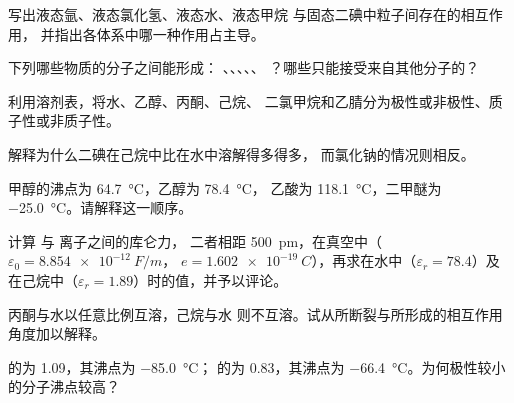 \begin{exercise}[$\star$]\label{exo:b1:intermolecular-forces-solvents:1}
写出液态氩、液态氯化氢、液态水、液态甲烷
与固态二碘中粒子间存在的相互作用，
并指出各体系中哪一种作用占主导。
\end{exercise}

\begin{exercise}[$\star$]\label{exo:b1:intermolecular-forces-solvents:2}
下列哪些物质的分子之间能形成：
、、、、、
？哪些只能接受来自其他分子的？
\end{exercise}

\begin{exercise}[$\star$]\label{exo:b1:intermolecular-forces-solvents:3}
           利用溶剂表，将水、乙醇、丙酮、己烷、
           二氯甲烷和乙腈分为极性或非极性、质子性或非质子性。
\end{exercise}

\begin{exercise}[$\star$]\label{exo:b1:intermolecular-forces-solvents:4}
解释为什么二碘在己烷中比在水中溶解得多得多，
而氯化钠的情况则相反。
\end{exercise}

\begin{exercise}[$\star\star$]\label{exo:b1:intermolecular-forces-solvents:5}
甲醇的沸点为 \qty{64.7}{\celsius}，乙醇为 \qty{78.4}{\celsius}，
乙酸为 \qty{118.1}{\celsius}，二甲醚为
\qty{-25.0}{\celsius}。请解释这一顺序。
\end{exercise}

\begin{exercise}[$\star\star$]\label{exo:b1:intermolecular-forces-solvents:6}
计算  与  离子之间的库仑力，
二者相距 \qty{500}{pm}，在真空中（$\varepsilon_0 = \qty{8.854e-12}{F/m}$，
$e = \qty{1.602e-19}{C}$），再求在水中（$\varepsilon_r = 78.4$）及
在己烷中（$\varepsilon_r = 1.89$）时的值，并予以评论。
\end{exercise}

\begin{exercise}[$\star\star$]\label{exo:b1:intermolecular-forces-solvents:7}
丙酮与水以任意比例互溶，己烷与水
则不互溶。试从所断裂与所形成的相互作用角度加以解释。
\end{exercise}

\begin{exercise}[$\star\star$]\label{exo:b1:intermolecular-forces-solvents:8}
 的为 \qty{1.09}{\debye}，其沸点为
\qty{-85.0}{\celsius}； 的为 \qty{0.83}{\debye}，其沸点为
\qty{-66.4}{\celsius}。为何极性较小的分子沸点较高？
\end{exercise}

